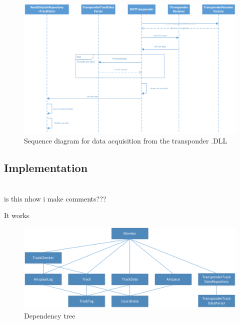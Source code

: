 \begin{figure}
	\centering
	\includegraphics[width=1.0\linewidth]{Images/SWTTransponder}
	\caption{Sequence diagram for data acquisition from the transponder .DLL}
	\label{fig:SWTTransponderSeq}
\end{figure}

\subsection{Implementation}
\\is this nhow i make comments???

It works

\begin{figure}
	\centering
	\includegraphics[width=1.0\linewidth]{"Images/Dependency tree"}
	\caption{Dependency tree}
	\label{fig:Dependencytree}
\end{figure}

\clearpage
